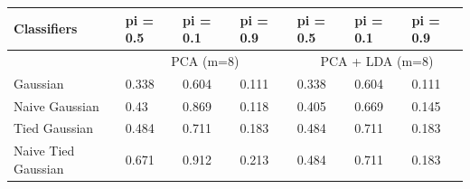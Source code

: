 \documentclass[letterpaper, italian]{article}
\begin{document}
    \begin{table}[]
        \centering
        \begin{tabular}{@{}lllllll@{}}
        \hline
        Classifiers         & pi = 0.5 & pi = 0.1 & pi = 0.9 & pi = 0.5   & pi = 0.1   & pi = 0.9  \\ \hline
                            & \multicolumn{3}{c}{PCA (m=8)}  & \multicolumn{3}{c}{PCA + LDA (m=8)} \\
        Gaussian            & 0.338    & 0.604    & 0.111    & 0.338      & 0.604      & 0.111     \\
        Naive Gaussian      & 0.43     & 0.869    & 0.118    & 0.405      & 0.669      & 0.145     \\
        Tied Gaussian       & 0.484    & 0.711    & 0.183    & 0.484      & 0.711      & 0.183     \\
        Naive Tied Gaussian & 0.671    & 0.912    & 0.213    & 0.484      & 0.711      & 0.183     \\ \hline
        \end{tabular}
        \end{table}
\end{document}
